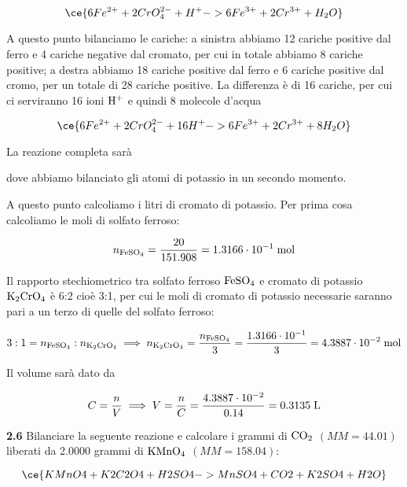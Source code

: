$$\ce{6Fe^{2+} + 2CrO_4^{2-} + H^+ -> 6Fe^{3+} + 2Cr^{3+} + H_2O}$$

A questo punto bilanciamo le cariche: a sinistra abbiamo 12 cariche positive dal ferro e 4 cariche negative dal cromato, per cui in totale abbiamo 8 cariche positive; a destra abbiamo 18 cariche positive dal ferro e 6 cariche positive dal cromo, per un totale di 28 cariche positive. La differenza è di 16 cariche, per cui ci serviranno 16 ioni $\rm H^+$ e quindi 8 molecole d'acqua

$$\ce{6Fe^{2+} + 2CrO_4^{2-} + 16H^+ -> 6Fe^{3+} + 2Cr^{3+} + 8H_2O}$$

La reazione completa sarà

\begin{center}



\end{center}

dove abbiamo bilanciato gli atomi di potassio in un secondo momento.


A questo punto calcoliamo i litri di cromato di potassio. Per prima cosa calcoliamo le moli di solfato ferroso:

$$n_{\rm FeSO_4}=\frac{20}{151.908}
=1.3166 \cdot 10^{-1} \; \rm mol$$

Il rapporto stechiometrico tra solfato ferroso $\rm FeSO_4$ e cromato di potassio $\rm K_2CrO_4$ è 6:2 cioè 3:1, per cui le moli di cromato di potassio necessarie saranno pari a un terzo di quelle del solfato ferroso:

$$3:1=n_{\rm FeSO_4}:n_{\rm K_2CrO_4}
\implies
n_{\rm K_2CrO_4}=\frac{n_{\rm FeSO_4}}{3}
=\frac{1.3166 \cdot 10^{-1}}{3}
=4.3887 \cdot 10^{-2} \; \rm mol$$

Il volume sarà dato da

$$C=\frac{n}{V}
\implies
V=\frac{n}{C}
=\frac{4.3887 \cdot 10^{-2}}{0.14}=0.3135 \; \rm L$$

\vspace{0.2cm}\textbf{2.6} Bilanciare la seguente reazione e calcolare i grammi di $\rm CO_2$ $(MM=44.01)$ liberati da 2.0000 grammi di $\rm KMnO_4$ $(MM=158.04)$:

$$\ce{KMnO4 + K2C2O4 + H2SO4 -> MnSO4 + CO2 + K2SO4 + H2O}$$

